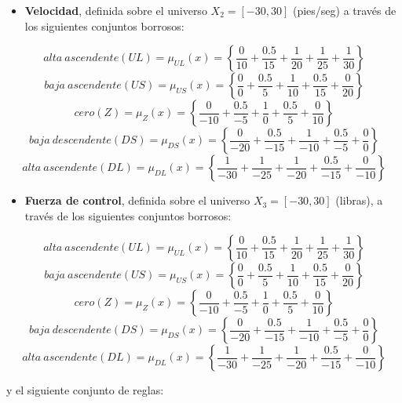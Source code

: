 \documentclass[
]{article}
\providecommand{\tightlist}{%
  \setlength{\itemsep}{0pt}\setlength{\parskip}{0pt}}
\begin{document}
\begin{itemize}
\tightlist
\item
  \textbf{Velocidad}, definida sobre el universo
  \(X_{2}=\left[-30,30\right]\) (pies/seg) a través de los siguientes
  conjuntos borrosos:
\end{itemize}

\[alta\ ascendente\left(UL\right)=\mu_{UL}\left(x\right)=\left\{ \frac{0}{10}+\frac{0.5}{15}+\frac{1}{20}+\frac{1}{25}+\frac{1}{30}\right\} \]
\[baja\ ascendente\left(US\right)=\mu_{US}\left(x\right)=\left\{ \frac{0}{0}+\frac{0.5}{5}+\frac{1}{10}+\frac{0.5}{15}+\frac{0}{20}\right\} \]
\[cero\left(Z\right)=\mu_{Z}\left(x\right)=\left\{ \frac{0}{-10}+\frac{0.5}{-5}+\frac{1}{0}+\frac{0.5}{5}+\frac{0}{10}\right\} \]
\[baja\ descendente\left(DS\right)=\mu_{DS}\left(x\right)=\left\{ \frac{0}{-20}+\frac{0.5}{-15}+\frac{1}{-10}+\frac{0.5}{-5}+\frac{0}{0}\right\} \]
\[alta\ ascendente\left(DL\right)=\mu_{DL}\left(x\right)=\left\{ \frac{1}{-30}+\frac{1}{-25}+\frac{1}{-20}+\frac{0.5}{-15}+\frac{0}{-10}\right\} \]

\begin{itemize}
\tightlist
\item
  \textbf{Fuerza de control}, definida sobre el universo
  \(X_{3}=\left[-30,30\right]\) (libras), a través de los siguientes
  conjuntos borrosos:
\end{itemize}

\[alta\ ascendente\left(UL\right)=\mu_{UL}\left(x\right)=\left\{ \frac{0}{10}+\frac{0.5}{15}+\frac{1}{20}+\frac{1}{25}+\frac{1}{30}\right\} \]
\[baja\ ascendente\left(US\right)=\mu_{US}\left(x\right)=\left\{ \frac{0}{0}+\frac{0.5}{5}+\frac{1}{10}+\frac{0.5}{15}+\frac{0}{20}\right\} \]
\[cero\left(Z\right)=\mu_{Z}\left(x\right)=\left\{ \frac{0}{-10}+\frac{0.5}{-5}+\frac{1}{0}+\frac{0.5}{5}+\frac{0}{10}\right\} \]
\[baja\ descendente\left(DS\right)=\mu_{DS}\left(x\right)=\left\{ \frac{0}{-20}+\frac{0.5}{-15}+\frac{1}{-10}+\frac{0.5}{-5}+\frac{0}{0}\right\} \]
\[alta\ ascendente\left(DL\right)=\mu_{DL}\left(x\right)=\left\{ \frac{1}{-30}+\frac{1}{-25}+\frac{1}{-20}+\frac{0.5}{-15}+\frac{0}{-10}\right\} \]

y el siguiente conjunto de reglas:
\end{document}
